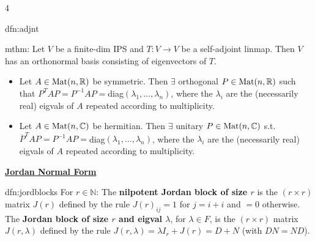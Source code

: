 \documentclass[landscape, 8pt]{extarticle}
\begin{document}
\begin{multicols*}{4}
\begin{dfn}{dfn:adjnt}{ }
		\end{dfn}
		
		
		\begin{mthm}{mthm:}{ }
			Let $V$ be a finite-dim IPS and $T : V \to V$ be a self-adjoint linmap. Then $V$ has an orthonormal basis consisting of eigenvectors of $T$.
			\begin{itemize}
				\item Let $A \in \operatorname{Mat}(n, \mathbb{R})$ be symmetric. Then $\exists$ orthogonal $P \in \operatorname{Mat}(n, \mathbb{R})$ such that $P^TAP = P^{-1}AP = $diag$(\lambda_1, \dots, \lambda_n)$, where the $\lambda_i$ are the (necessarily real) eigvals of $A$ repeated according to multiplicity.
				\item Let $A \in \operatorname{Mat}(n, \mathbb{C})$ be hermitian. Then $\exists$ unitary $P \in \operatorname{Mat}(n, \mathbb{C})$ s.t. $\overline{P}^T A P = P^{-1} AP = $diag$(\lambda_1, \dots, \lambda_n)$, where the $\lambda_i$ are the (necessarily real) eigvals of $A$ repeated according to multiplicity.
			\end{itemize}
			
		\end{mthm}
		
		
		
	
	
	{\footnotesize \textbf{\underline{Jordan Normal Form}}}
		
		
		
		\begin{dfn}{dfn:jordblocks}{ }
			For $r \in \mathbb{N}$: The \textbf{nilpotent Jordan block of size $r$} is the $(r \times r)$ matrix $J(r)$ defined by the rule $J(r)_{ij} = 1$ for $j = i + i$ and $=0$ otherwise. The \textbf{Jordan block of size $r$ and eigval $\lambda$}, for $\lambda \in F$, is the $(r \times r)$ matrix $J(r, \lambda)$ defined by the rule $J(r, \lambda) = \lambda I_r + J(r) = D + N$ (with $DN = ND$).
			
		\end{dfn}
		

\end{multicols*}
\end{document}
